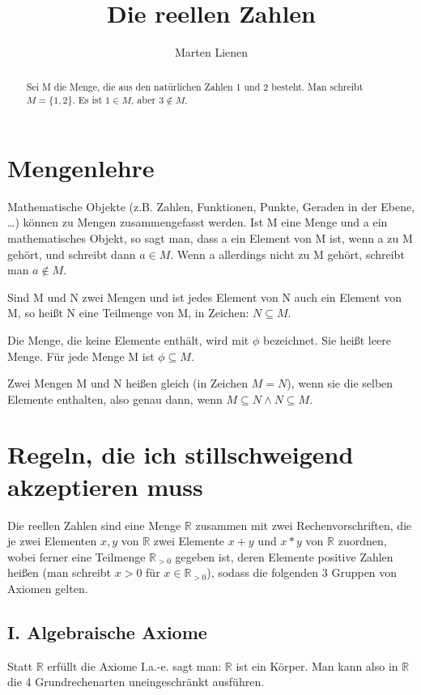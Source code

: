 \documentclass[a4paper,10pt]{article}
\title{Die reellen Zahlen}
\author{Marten Lienen}
\begin{document}
\maketitle

\section{Mengenlehre}

Mathematische Objekte (z.B. Zahlen, Funktionen, Punkte, Geraden in der Ebene, \dots) können zu Mengen zusammengefasst werden.
Ist M eine Menge und a ein mathematisches Objekt, so sagt man, dass a ein Element von M ist, wenn a zu M gehört, und schreibt
dann $a \in M$. Wenn a allerdings nicht zu M gehört, schreibt man $a \notin M$.

\begin{abstract}
 Sei M die Menge, die aus den natürlichen Zahlen 1 und 2 besteht. Man schreibt $M = \{1, 2\}$. Es ist $1 \in M$, aber $3 \notin M$.
\end{abstract}

Sind M und N zwei Mengen und ist jedes Element von N auch ein Element von M, so heißt N eine Teilmenge von M, in Zeichen: $N \subseteq M$.

Die Menge, die keine Elemente enthält, wird mit $\phi$ bezeichnet. Sie heißt leere Menge. Für jede Menge M ist $\phi \subseteq M$.

Zwei Mengen M und N heißen gleich (in Zeichen $M = N$), wenn sie die selben Elemente enthalten, also genau dann, wenn $M \subseteq N \land
N \subseteq M$.

\section{Regeln, die ich stillschweigend akzeptieren muss}

Die reellen Zahlen sind eine Menge $\mathbb{R}$ zusammen mit zwei Rechenvorschriften, die je zwei Elementen $x, y$ von $\mathbb{R}$
zwei Elemente $x + y$ und $x * y$ von $\mathbb{R}$ zuordnen, wobei ferner  eine Teilmenge $\mathbb{R}_{> 0}$ gegeben ist, deren
Elemente positive Zahlen heißen (man schreibt $x > 0$ für $x \in \mathbb{R}_{> 0}$), sodass die folgenden 3 Gruppen von Axiomen gelten.

\subsection{I. Algebraische Axiome}

Statt $\mathbb{R}$ erfüllt die Axiome I.a.-e. sagt man: $\mathbb{R}$ ist ein Körper. Man kann also in $\mathbb{R}$ die 4 Grundrechenarten
uneingeschränkt ausführen.
\end{document}
